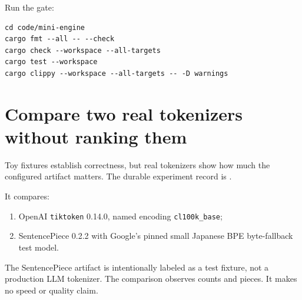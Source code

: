 Run the gate:

\begin{verbatim}
cd code/mini-engine
cargo fmt --all -- --check
cargo check --workspace --all-targets
cargo test --workspace
cargo clippy --workspace --all-targets -- -D warnings
\end{verbatim}

\section{Compare two real tokenizers without ranking
them}\label{compare-two-real-tokenizers-without-ranking-them}

Toy fixtures establish correctness, but real tokenizers show how much
the configured artifact matters. The durable experiment record is
\href{https://github.com/hermonai/inside-the-llm-engine/blob/astra-visual-rewrite/research/part-01/tokenizer-comparison.md}{\texttt{}}.

It compares:

\begin{enumerate}
\def\labelenumi{\arabic{enumi}.}
\tightlist
\item
  OpenAI \texttt{tiktoken} 0.14.0, named encoding \texttt{cl100k\_base};
\item
  SentencePiece 0.2.2 with Google's pinned small Japanese BPE
  byte-fallback test model.
\end{enumerate}

The SentencePiece artifact is intentionally labeled as a test fixture,
not a production LLM tokenizer. The comparison observes counts and
pieces. It makes no speed or quality claim.


